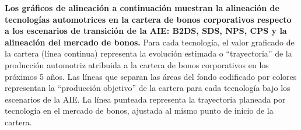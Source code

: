 \documentclass[10pt,table]{article}\usepackage[]{graphicx}\usepackage[]{color}
\begin{document}
	\begin{multicols}{2}
		\textbf{Los gráficos de alineación a continuación muestran la alineación de tecnologías automotrices en la cartera de bonos corporativos respecto a los escenarios de transición de la AIE: B2DS, SDS, NPS, CPS y la alineación del mercado de bonos.  } 
		Para cada tecnología, el valor graficado de la cartera (línea continua) representa la evolución estimada o “trayectoria” de la producción automotriz atribuida a la cartera de bonos corporativos en los próximos 5 años.                   
		Las líneas que separan las áreas del fondo codificado por colores representan la “producción objetivo” de la cartera para cada tecnología bajo los escenarios de la AIE. La línea punteada representa la trayectoria planeada por tecnología en el mercado de bonos, ajustada al mismo punto de inicio de la cartera.
		
	\end{multicols}		
\end{document}
